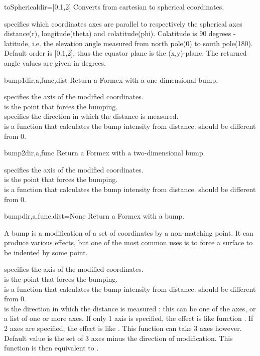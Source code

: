 {{\begin{methoddesc}{toSpherical}{dir=[0,1,2]}
Converts from cartesian to spherical coordinates.

 specifies which coordinates axes are parallel to respectively the spherical axes distance(r), longitude(theta) and colatitude(phi). Colatitude is 90 degrees - latitude, i.e. the elevation angle measured from north pole(0) to south pole(180). Default order is [0,1,2], thus the equator plane is the (x,y)-plane. The returned angle values are given in degrees.
\end{methoddesc}

\begin{methoddesc}{bump1}{dir,a,func,dist}
Return a Formex with a one-dimensional bump.

 specifies the axis of the modified coordinates.\\
 is the point that forces the bumping.\\
 specifies the direction in which the distance is measured.\\
 is a function that calculates the bump intensity from distance.  should be different from 0.
\end{methoddesc}

\begin{methoddesc}{bump2}{dir,a,func}
Return a Formex with a two-dimensional bump.

 specifies the axis of the modified coordinates.\\
 is the point that forces the bumping.\\
 is a function that calculates the bump intensity from distance.  should be different from 0.
\end{methoddesc}

\begin{methoddesc}{bump}{dir,a,func,dist=None}
Return a Formex with a bump.

A bump is a modification of a set of coordinates by a non-matching point. It can produce various effects, but one of the most common uses is to force a surface to be indented by some point.
        
 specifies the axis of the modified coordinates.\\
 is the point that forces the bumping.\\
 is a function that calculates the bump intensity from distance.  should be different from 0.\\
 is the direction in which the distance is measured : this can be one of the axes, or a list of one or more axes. If only 1 axis is specified, the effect is like function . If 2 axes are specified, the effect is like . This function can take 3 axes however. Default value is the set of 3 axes minus the direction of modification. This function is then equivalent to .
\end{methoddesc}

}}
